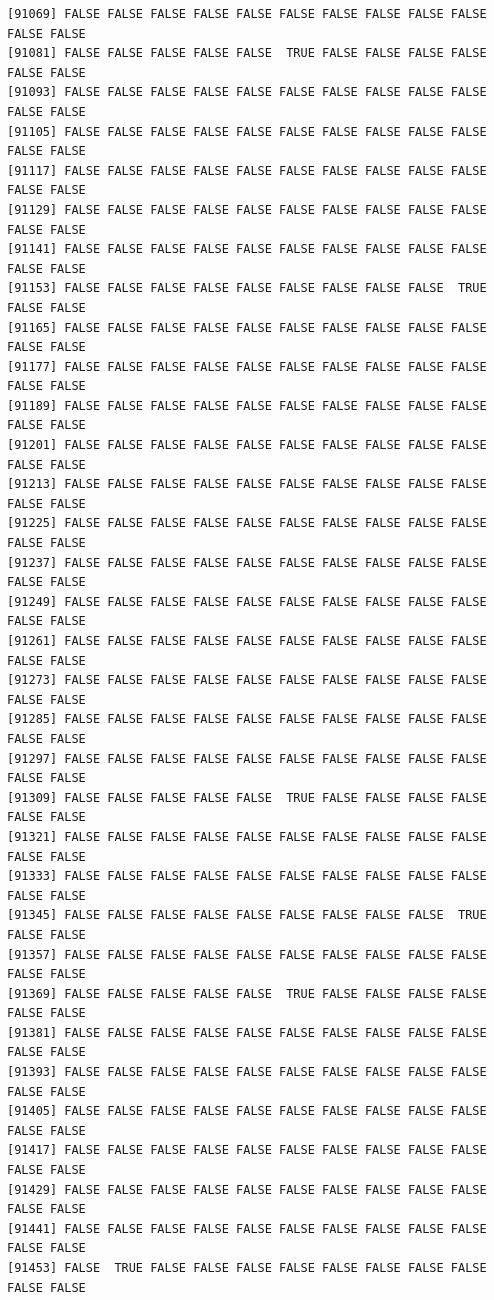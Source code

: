 \documentclass[
  a4paper,
  DIV=11,
  numbers=noendperiod]{scrartcl}
\begin{document}
\begin{verbatim}
[91069] FALSE FALSE FALSE FALSE FALSE FALSE FALSE FALSE FALSE FALSE FALSE FALSE
[91081] FALSE FALSE FALSE FALSE FALSE  TRUE FALSE FALSE FALSE FALSE FALSE FALSE
[91093] FALSE FALSE FALSE FALSE FALSE FALSE FALSE FALSE FALSE FALSE FALSE FALSE
[91105] FALSE FALSE FALSE FALSE FALSE FALSE FALSE FALSE FALSE FALSE FALSE FALSE
[91117] FALSE FALSE FALSE FALSE FALSE FALSE FALSE FALSE FALSE FALSE FALSE FALSE
[91129] FALSE FALSE FALSE FALSE FALSE FALSE FALSE FALSE FALSE FALSE FALSE FALSE
[91141] FALSE FALSE FALSE FALSE FALSE FALSE FALSE FALSE FALSE FALSE FALSE FALSE
[91153] FALSE FALSE FALSE FALSE FALSE FALSE FALSE FALSE FALSE  TRUE FALSE FALSE
[91165] FALSE FALSE FALSE FALSE FALSE FALSE FALSE FALSE FALSE FALSE FALSE FALSE
[91177] FALSE FALSE FALSE FALSE FALSE FALSE FALSE FALSE FALSE FALSE FALSE FALSE
[91189] FALSE FALSE FALSE FALSE FALSE FALSE FALSE FALSE FALSE FALSE FALSE FALSE
[91201] FALSE FALSE FALSE FALSE FALSE FALSE FALSE FALSE FALSE FALSE FALSE FALSE
[91213] FALSE FALSE FALSE FALSE FALSE FALSE FALSE FALSE FALSE FALSE FALSE FALSE
[91225] FALSE FALSE FALSE FALSE FALSE FALSE FALSE FALSE FALSE FALSE FALSE FALSE
[91237] FALSE FALSE FALSE FALSE FALSE FALSE FALSE FALSE FALSE FALSE FALSE FALSE
[91249] FALSE FALSE FALSE FALSE FALSE FALSE FALSE FALSE FALSE FALSE FALSE FALSE
[91261] FALSE FALSE FALSE FALSE FALSE FALSE FALSE FALSE FALSE FALSE FALSE FALSE
[91273] FALSE FALSE FALSE FALSE FALSE FALSE FALSE FALSE FALSE FALSE FALSE FALSE
[91285] FALSE FALSE FALSE FALSE FALSE FALSE FALSE FALSE FALSE FALSE FALSE FALSE
[91297] FALSE FALSE FALSE FALSE FALSE FALSE FALSE FALSE FALSE FALSE FALSE FALSE
[91309] FALSE FALSE FALSE FALSE FALSE  TRUE FALSE FALSE FALSE FALSE FALSE FALSE
[91321] FALSE FALSE FALSE FALSE FALSE FALSE FALSE FALSE FALSE FALSE FALSE FALSE
[91333] FALSE FALSE FALSE FALSE FALSE FALSE FALSE FALSE FALSE FALSE FALSE FALSE
[91345] FALSE FALSE FALSE FALSE FALSE FALSE FALSE FALSE FALSE  TRUE FALSE FALSE
[91357] FALSE FALSE FALSE FALSE FALSE FALSE FALSE FALSE FALSE FALSE FALSE FALSE
[91369] FALSE FALSE FALSE FALSE FALSE  TRUE FALSE FALSE FALSE FALSE FALSE FALSE
[91381] FALSE FALSE FALSE FALSE FALSE FALSE FALSE FALSE FALSE FALSE FALSE FALSE
[91393] FALSE FALSE FALSE FALSE FALSE FALSE FALSE FALSE FALSE FALSE FALSE FALSE
[91405] FALSE FALSE FALSE FALSE FALSE FALSE FALSE FALSE FALSE FALSE FALSE FALSE
[91417] FALSE FALSE FALSE FALSE FALSE FALSE FALSE FALSE FALSE FALSE FALSE FALSE
[91429] FALSE FALSE FALSE FALSE FALSE FALSE FALSE FALSE FALSE FALSE FALSE FALSE
[91441] FALSE FALSE FALSE FALSE FALSE FALSE FALSE FALSE FALSE FALSE FALSE FALSE
[91453] FALSE  TRUE FALSE FALSE FALSE FALSE FALSE FALSE FALSE FALSE FALSE FALSE

\end{verbatim}
\end{document}
